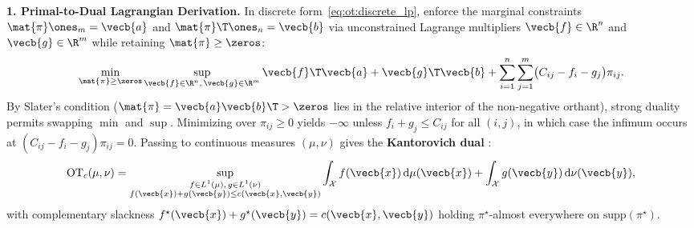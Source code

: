 \documentclass[../../../../master.tex]{subfiles}
\begin{document}
\begin{coremath}
\label{cm:ot:duality}
\textbf{1. Primal-to-Dual Lagrangian Derivation.} In discrete form~\eqref{eq:ot:discrete_lp}, enforce the marginal constraints $\mat{\pi}\ones_m = \vecb{a}$ and $\mat{\pi}\T\ones_n = \vecb{b}$ via unconstrained Lagrange multipliers $\vecb{f} \in \R^n$ and $\vecb{g} \in \R^m$ while retaining $\mat{\pi} \ge \zeros$:
\begin{equation}
\label{eq:ot:lagrangian_lp}
  \min_{\mat{\pi} \ge \zeros} \sup_{\vecb{f} \in \R^n,\, \vecb{g} \in \R^m}
  \vecb{f}\T\vecb{a} + \vecb{g}\T\vecb{b} + \sum_{i=1}^n \sum_{j=1}^m \bigl(C_{ij} - f_i - g_j\bigr)\pi_{ij}.
\end{equation}
By Slater's condition ($\mat{\pi} = \vecb{a}\vecb{b}\T > \zeros$ lies in the relative interior of the non-negative orthant), strong duality permits swapping $\min$ and $\sup$. Minimizing over $\pi_{ij} \ge 0$ yields $-\infty$ unless $f_i + g_j \le C_{ij}$ for all $(i,j)$, in which case the infimum occurs at $(C_{ij} - f_i - g_j)\pi_{ij} = 0$. Passing to continuous measures $(\mu, \nu)$ gives the \textbf{Kantorovich dual} :
\begin{equation}
\label{eq:ot:dual}
  \mathrm{OT}_c(\mu, \nu) = \sup_{\substack{f \in L^1(\mu),\, g \in L^1(\nu) \\ f(\vecb{x}) + g(\vecb{y}) \le c(\vecb{x},\vecb{y})}}
  \int_{\mathcal{X}} f(\vecb{x})\,\mathrm{d}\mu(\vecb{x}) + \int_{\mathcal{X}} g(\vecb{y})\,\mathrm{d}\nu(\vecb{y}),
\end{equation}
with complementary slackness $f^\star(\vecb{x}) + g^\star(\vecb{y}) = c(\vecb{x}, \vecb{y})$ holding $\pi^\star$-almost everywhere on $\mathrm{supp}(\pi^\star)$.


\end{coremath}
\end{document}
